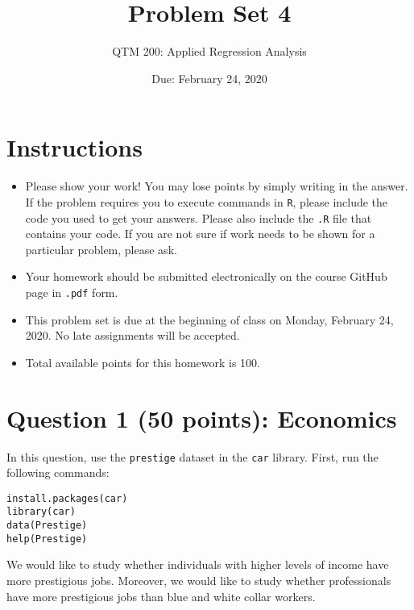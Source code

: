 \documentclass[12pt,letterpaper]{article}
\title{Problem Set 4}
\date{Due: February 24, 2020}
\author{QTM 200: Applied Regression Analysis}
\begin{document}
	\maketitle
	
	\section*{Instructions}
	\begin{itemize}
		\item Please show your work! You may lose points by simply writing in the answer. If the problem requires you to execute commands in \texttt{R}, please include the code you used to get your answers. Please also include the \texttt{.R} file that contains your code. If you are not sure if work needs to be shown for a particular problem, please ask.
		\item Your homework should be submitted electronically on the course GitHub page in \texttt{.pdf} form.
		\item This problem set is due at the beginning of class on Monday, February 24, 2020. No late assignments will be accepted.
		\item Total available points for this homework is 100.
	\end{itemize}

	\vspace{.5cm}
\section*{Question 1 (50 points): Economics}
\vspace{.25cm}
\noindent 	
In this question, use the \texttt{prestige} dataset in the \texttt{car} library. First, run the following commands:

\begin{verbatim}
install.packages(car)
library(car)
data(Prestige)
help(Prestige)
\end{verbatim} 


\noindent We would like to study whether individuals with higher levels of income have more prestigious jobs. Moreover, we would like to study whether professionals have more prestigious jobs than blue and white collar workers.

	  
\end{document}
